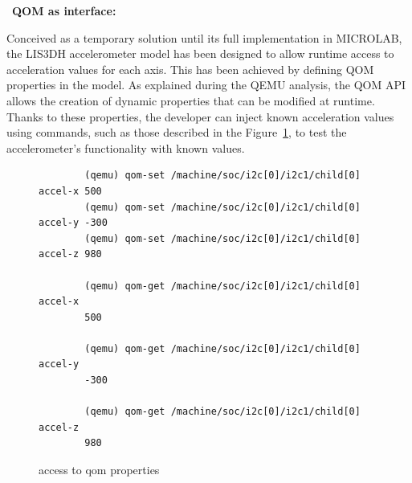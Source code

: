 \textbullet\ \textbf{QOM as interface:}

Conceived as a temporary solution until its full implementation in MICROLAB, 
the LIS3DH accelerometer model has been designed to allow runtime access to 
acceleration values for each axis. This has been achieved by defining QOM properties 
in the model. As explained during the QEMU analysis, the QOM API allows the 
creation of dynamic properties that can be modified at runtime. Thanks to these 
properties, the developer can inject known acceleration values using commands, such 
as those described in the Figure~\ref{fig:qom_exampe}, to test the accelerometer's functionality with known 
values.

\begin{figure}[H]
    \centering
    \small
    \begin{verbatim}
        (qemu) qom-set /machine/soc/i2c[0]/i2c1/child[0] accel-x 500 
        (qemu) qom-set /machine/soc/i2c[0]/i2c1/child[0] accel-y -300 
        (qemu) qom-set /machine/soc/i2c[0]/i2c1/child[0] accel-z 980
        
        (qemu) qom-get /machine/soc/i2c[0]/i2c1/child[0] accel-x 
        500

        (qemu) qom-get /machine/soc/i2c[0]/i2c1/child[0] accel-y 
        -300
        
        (qemu) qom-get /machine/soc/i2c[0]/i2c1/child[0] accel-z
        980  
    \end{verbatim}
    \caption{access to qom properties}
    \label{fig:qom_exampe}
\end{figure}

